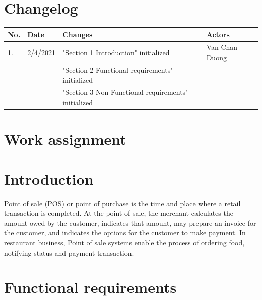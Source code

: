 \documentclass[a4paper,11pt]{extarticle}
\begin{document}

\newpage
\tableofcontents
\newpage

\section*{Changelog}
\begin{tabularx}{\textwidth}{|l|l|X|l|}
\hline
\textbf{No.} & \textbf{Date} & \textbf{Changes} & \textbf{Actors} \\
\hline
1. & 2/4/2021 & "Section 1 Introduction" initialized & Van Chan Duong \\
& & "Section 2 Functional requirements" initialized & \\
& & "Section 3 Non-Functional requirements" initialized & \\
\hline

\end{tabularx}

\section*{Work assignment}

\newpage
\section{Introduction}
Point of sale (POS) or point of purchase is the time and place where a retail transaction is completed. At the point of sale, the merchant calculates the amount owed by the customer, indicates that amount, may prepare an invoice for the customer, and indicates the options for the customer to make payment. In restaurant business, Point of sale systems enable the process of ordering food, notifying status and payment transaction.
\newpage

\section{Functional requirements}
\end{document}
